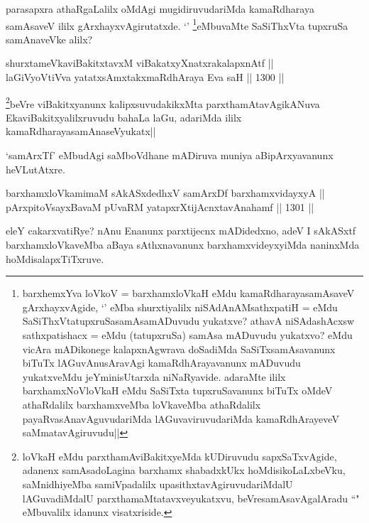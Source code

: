 \begin{artha}
parasapxra athaRgaLalilx oMdAgi mugidiruvudariMda kamaRdharaya samAsaveV ililx gArxhayxvAgirutatxde. `\stext' \footnote{barxhemxYva loVkoV = barxhamxloVkaH eMdu kamaRdharayasamAsaveV gArxhayxvAgide, `\stext' eMba shurxtiyalilx niSAdAnAMsathxpatiH = eMdu SaSiThxVtatupxruSasamAsamADuvudu yukatxve? athavA niSAdashAcxsw sathxpatishacx = eMdu (tatupxruSa) samAsa mADuvudu yukatxvo? eMdu vicAra mADikonege kalapxnAgwrava doSadiMda SaSiTxsamAsavanunx biTuTx lAGuvAnusAravAgi kamaRdhArayavanunx mADuvudu yukatxveMdu jeYminisUtarxda niNaRyavide. adaraMte ililx barxhamxNoVloVkaH eMdu SaSiTxta tupxruSavanunx biTuTx oMdeV athaRdalilx barxhamxveMba loVkaveMba athaRdalilx payaRvasAnavAguvudariMda lAGuvaviruvudariMda kamaRdhArayeveV saMmatavAgiruvudu||}eMbuvaMte SaSiThxVta tupxruSa samAnaveVke alilx?
\end{artha}

\begin{shl}
shurxtameVkaviBakitxtavxM viBakatxyXnatxrakalapxnAtf || \\
laGiVyoV\s tiVva yatatxsAmxtakxmaRdhAraya Eva saH ||  1300 ||  
\end{shl}

\begin{artha}
\footnote{loVkaH eMdu parxthamAviBakitxyeMda kUDiruvudu sapxSaTxvAgide, adanenx samAsadoLagina barxhamx shabadxkUkx hoMdisikoLaLxbeVku, saMnidhiyeMba samiVpadalilx upasithxtavAgiruvudariMdalU lAGuvadiMdalU parxthamaMtatavxveyukatxvu, beVresamAsavAgalAradu ``\stext" eMbuvalilx idanunx visatxriside.}beVre viBakitxyanunx kalipxsuvudakikxMta parxthamAtavAgikANuva EkaviBakitxyalilxruvudu bahaLa laGu, adariMda ililx kamaRdharayasamAnaseVyukatx||
\end{artha}

\begin{artha}
`samArxTf' eMbudAgi saMboVdhane mADiruva muniya aBipArxyavanunx heVLutAtxre.
\end{artha}

\begin{shl}
barxhamxloVkamimaM sAkASxdedhxV samArxDf barxhamxvidayxyA || \\
pArxpitoV\s sayxBavaM pUvaRM yatapxrXtijAcnxtavAnahamf ||  1301 ||  
\end{shl}

\begin{artha}
eleY cakarxvatiRye? nAnu Enanunx parxtijecnx mADidedxno, adeV I sAkASxtf barxhamxloVkaveMba aBaya sAthxnavanunx barxhamxvideyxyiMda naninxMda hoMdisalapxTiTxruve.
\end{artha}

